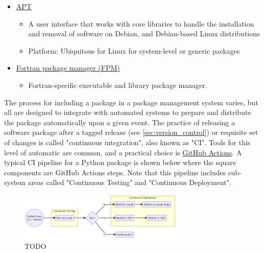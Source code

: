 \documentclass[]{nrel}
\begin{document}
\begin{itemize}
\begin{itemize}
\end{itemize}

\item \href{https://en.wikipedia.org/wiki/APT\_(software)}{APT}
\begin{itemize}
\item A user interface that works with core libraries to handle the installation and removal of software on Debian, and Debian-based Linux distributions

\item Platform: Ubiquitous for Linux for system-level or generic packages

\end{itemize}

\item \href{https://fpm.fortran-lang.org/index.html}{Fortran package manager (FPM)}
\begin{itemize}
\item Fortran-specific executable and library package manager.

\end{itemize}

\end{itemize}

The process for including a package in a package management system varies, but all are designed
to integrate with automated systems to prepare and distribute the package automatically upon
a given event. The practice of releasing a software package after a tagged release
(see \ref{sec:version_control}) or requisite set of changes is called "continuous integration",
also known as "CI". Tools for this level of automatic are common, and a practical choice
is \href{https://github.com/features/actions}{GitHub Actions}. A typical CI pipeline for a Python
package is shown below where the square components are GitHub Actions steps. Note that this
pipeline includes sub-system areas called "Continuous Testing" and "Continuous Deployment".

\begin{figure}[htbp] \begin{center}
\includegraphics[width=0.7\textwidth]{mermaid-ece5068b3a6eb10d6392a7ca035a7cc4736d3183.png}
\caption{TODO}
\label{fig:fig1} \end{center} \end{figure}
\end{document}
